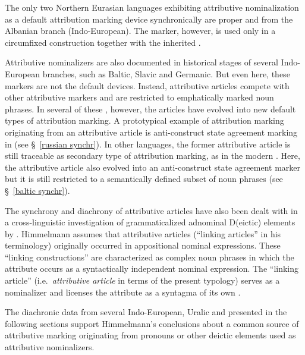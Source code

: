The only two Northern Eurasian languages exhibiting attributive nominalization as a default attribution marking device synchronically are  proper and  from the Albanian branch (Indo-European). The marker, however, is used only in a circumfixed construction together with the inherited .

Attributive nominalizers are also documented in historical stages of several Indo-European branches, such as Baltic, Slavic and Germanic. But even here, these markers are not the default devices. Instead, attributive articles compete with other attributive markers and are restricted to emphatically marked noun phrases. In several of these , however, the articles have evolved into new default types of attribution marking. A prototypical example of attribution marking originating from an attributive article is anti\hyp{}construct state agreement marking in  (see \S~\ref{russian synchr}). In other languages, the former attributive article is still traceable as secondary type of attribution marking, as in the modern . Here, the attributive article also evolved into an anti\hyp{}construct state agreement marker but it is still restricted to a semantically defined subset of noun phrases (see \S~\ref{baltic synchr}). 

The synchrony and diachrony of attributive articles have also been dealt with in a cross-linguistic investigation of grammaticalized adnominal D(eictic) elements by \cite{himmelmann1997}. Himmelmann assumes that attributive articles (“linking articles” in his terminology) originally occurred in appositional nominal expressions. These “linking constructions” are characterized as complex noun phrases in which the attribute occurs as a syntactically independent nominal expression. The “linking article” (i.e.~\textit{attributive article} in terms of the present typology) serves as a nominalizer and licenses the attribute as a syntagma of its own \cite[188]{himmelmann1997}.

The diachronic data from several Indo-European, Uralic and  presented in the following sections support Himmelmann's conclusions about a common source of attributive marking originating from pronouns or other deictic elements used as attributive nominalizers.

